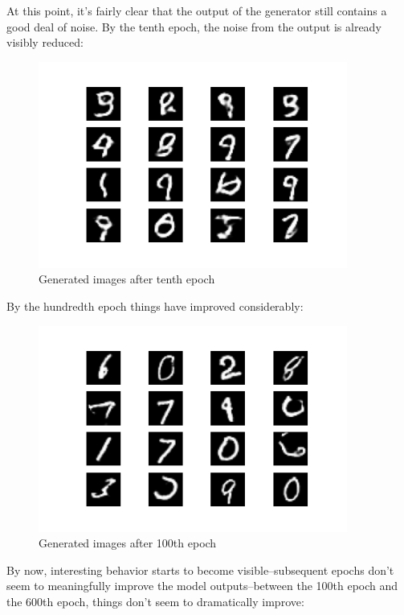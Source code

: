 \documentclass{article}
\begin{document}
\par At this point, it's fairly clear that the output of the generator still contains a good deal of noise.
By the tenth epoch, the noise from the output is already visibly reduced:

\begin{figure}[H]
    \centering
    \includegraphics[width=4in]{csci-8110/hw-4/images/generated_plot_e010.png}
    \caption{Generated images after tenth epoch}
    \label{fig:ep10}
\end{figure}

\par By the hundredth epoch things have improved considerably:

\begin{figure}[H]
    \centering
    \includegraphics[width=4in]{csci-8110/hw-4/images/generated_plot_e100.png}
    \caption{Generated images after 100th epoch}
    \label{fig:ep100}
\end{figure}

\par By now, interesting behavior starts to become visible--subsequent epochs don't seem to meaningfully improve the model outputs--between the 100th epoch and the 600th epoch, things don't seem to dramatically improve:
\end{document}
